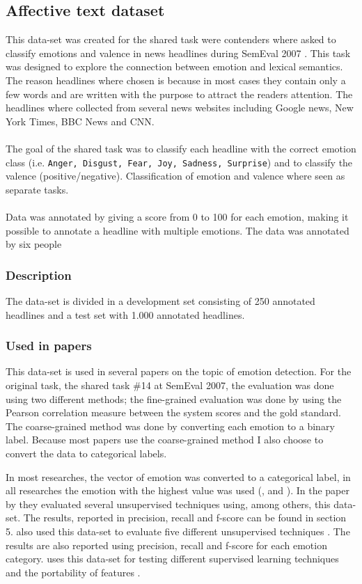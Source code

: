 \documentclass[
10pt, %
a4paper, %
oneside, %
headinclude,footinclude, %
BCOR5mm, %
]{scrartcl}
\begin{document}
\subsection{Affective text dataset}
This data-set was created for the shared task were contenders where asked to classify emotions and valence in news headlines during SemEval 2007 \citep{strapparava2007semeval}. This task was designed to explore the connection between emotion and lexical semantics. The reason headlines where chosen is because  in most cases they contain only a few words and are written with the purpose to attract the readers attention. The headlines where collected from several news websites including Google news, New York Times, BBC News and CNN. \\ \\
The goal of the shared task was to classify each headline with the correct emotion class (i.e. \texttt{Anger, Disgust, Fear, Joy, Sadness, Surprise}) and to classify the valence (positive/negative). Classification of emotion and valence where seen as separate tasks. \\ \\
Data was annotated by giving a score from 0 to 100 for each emotion, making it possible to annotate a headline with multiple emotions. The data was annotated by six people

\subsubsection{Description}
The data-set is divided in a development set consisting of 250 annotated headlines and a test set with 1.000 annotated headlines.

\subsubsection{Used in papers}
This data-set is used in several papers on the topic of emotion detection. For the original task, the shared task \#14 at SemEval 2007, \citep{strapparava2007semeval} the evaluation was done using two different methods; the fine-grained evaluation was done by using the Pearson correlation measure between the system scores and the gold standard. The coarse-grained method was done by converting each emotion to a binary label. Because most papers use the coarse-grained method I also choose to convert the data to categorical labels.

In most researches, the vector of emotion was converted to a categorical label, in all researches the emotion with the highest value was used (\citet{chaffar2011using}, \citet{calvo2013emotions} and \citet{kim2010evaluation}).
In the paper by \citep{kim2010evaluation} they evaluated several unsupervised techniques using, among others, this data-set. The results, reported in precision, recall and f-score can be found in section 5. \citeauthor{strapparava2008learning} also used this data-set to evaluate five different unsupervised techniques . The results are also reported using precision, recall and f-score for each emotion category. \citeauthor{mohammad:2012:NAACL-HLT} uses this data-set for testing different supervised learning techniques and the portability of features \citep{mohammad:2012:NAACL-HLT}.
\end{document}
